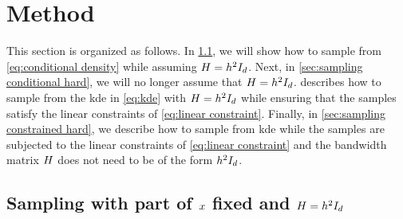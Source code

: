 \section{Method}
\label{sec:method}

This section is organized as follows.
In \cref{sec:sampling conditional simple}, we will show how to sample from \cref{eq:conditional density} while assuming $H=h^2 I_{d}$.
Next, in \cref{sec:sampling conditional hard}, we will no longer assume that $H=h^2 I_{d}$.
 describes how to sample from the \ac{kde} in \cref{eq:kde} with $H=h^2 I_{d}$ while ensuring that the samples satisfy the linear constraints of \cref{eq:linear constraint}.
Finally, in \cref{sec:sampling constrained hard}, we describe how to sample from \ac{kde} while the samples are subjected to the linear constraints of \cref{eq:linear constraint} and the bandwidth matrix $H$ does not need to be of the form $h^2 I_{d}$.



\subsection{Sampling with part of $x$ fixed and $H=h^2I_{d}$}
\label{sec:sampling conditional simple}

